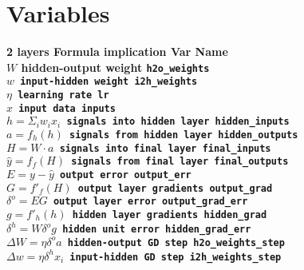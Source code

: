 \documentclass[11pt]{article}
\begin{document}
\section{Variables}
  \begin{tabbing}
    \bf{2 layers Formula} \hspace{5mm} \= \bf{implication} \hspace{30mm} \= \bf{Var Name} \\
    $W$                            \> hidden-output weight      \> \tt{h2o\_weights} \\
    $w$                            \> input-hidden weight       \> \tt{i2h\_weights} \\
    $\eta$                         \> learning rate             \> \tt{lr}       \\
    $x$                            \> input data                \> \tt{inputs} \\
    $h = \Sigma_i w_i x_i$         \> signals into hidden layer \> \tt{hidden\_inputs} \\
    $a = f_h(h)$                   \> signals from hidden layer \> \tt{hidden\_outputs} \\
    $H = W \cdot a$                \> signals into final layer  \> \tt{final\_inputs} \\
    $\hat{y} = f_f(H)$             \> signals from final layer  \> \tt{final\_outputs} \\
    $E = y-\hat{y}$                \> output error              \> \tt{output\_err} \\
    $G = f'_f(H)$                  \> output layer gradients    \> \tt{output\_grad} \\
    $\delta^o = E G$               \> output layer error        \> \tt{output\_grad\_err} \\
    $g = f'_h(h)$                  \> hidden layer gradients    \> \tt{hidden\_grad} \\
    $\delta^h = W\delta^o g$       \> hidden unit error         \> \tt{hidden\_grad\_err} \\
    $\Delta W = \eta \delta^o a$   \> hidden-output GD step     \> \tt{h2o\_weights\_step}\\
    $\Delta w = \eta \delta^h x_i$ \> input-hidden GD step      \> \tt{i2h\_weights\_step} \\
  \end{tabbing}
\end{document}

